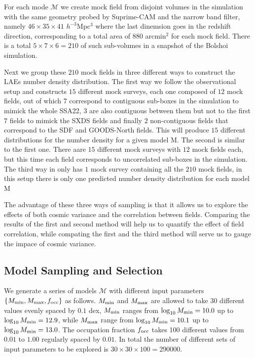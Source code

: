 \documentclass{emulateapj}
\begin{document}
For each mode ${\mathcal M}$ we create mock field from disjoint volumes in the simulation with the same geometry probed by Suprime-CAM and the narrow band filter, namely $46\times 35\times 41$ $h^{-3}$Mpc$^{3}$ where the last dinemsion goes in the redshift direction, corresponding to a total area of $880$ arcmin$^{2}$ for each mock field. There is a total $5\times 7 \times 6=210$ of such sub-volumes in a snapshot of the Bolshoi simulation. 

Next we group these $210$ mock fields in three different ways to construct the LAEs number density distribution. The first way we follow the observational setup and constructs $15$ different mock surveys, each one composed of $12$ mock fields, out of which $7$ correspond to contiguous sub-boxes in the simulation to mimick the whole SSA22, $3$ are also contiguous between them but not to the first $7$ fields to mimick the SXDS fields and finally $2$ non-contiguous fields that correspond to the SDF and GOODS-North fields. This will produce $15$ different distributions for the number density for a given model ${\mathrm M}$. The second is similar to the first one. There aare $15$ different mock surveys with $12$ mock fields each, but this time each field corresponds to uncorrelated sub-boxes in the simulation. The third way in only has $1$ mock survey containing all the $210$ mock fields, in this setup there is only one predicted number density distribution for each model ${\mathrm M}$

The advantage of these three ways of sampling is that it allows us to explore the effects of both cosmic variance and the correlation between fields. Comparing the results of the first and second method will help us to quantify the effect of field correlation, while compating the first and the third method will serve us to gauge the impace of cosmic variance.


\subsection{Model Sampling and Selection}

We generate a series of models ${\mathcal M}$ with different input parameters$\{M_{\rm min}, M_{\rm max}, f_{\rm occ}\}$ as follows. $M_{\rm min}$ and $M_{\rm max}$ are allowed to take 30 different values evenly spaced by $0.1$ dex, $M_{\rm min}$ ranges from $\log_{10}M_{\rm min}=10.0$ up to $\log_{10}M_{\rm min}=12.9$, while $M_{\rm max}$ range  from $\log_{10}M_{\rm min}=10.1$ up to $\log_{10}M_{\rm min}=13.0$. The occupation fraction $f_{\rm occ}$ takes 100 different values from $0.01$ to $1.00$ regularly spaced by $0.01$. In total the number of different sets of input parameters to be explored is $30 \times 30\times 100 = 290000$.
\end{document}

